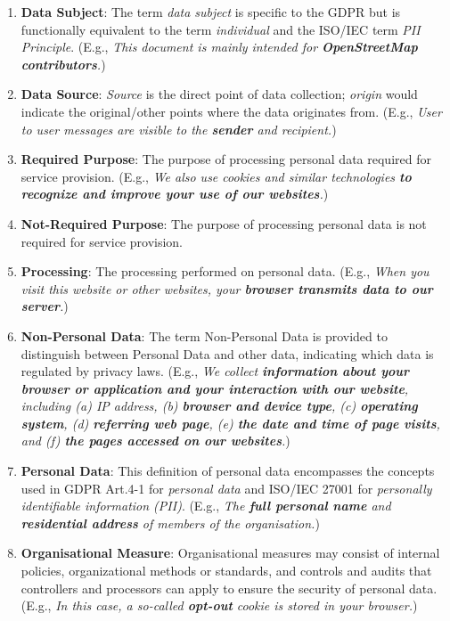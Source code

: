 \documentclass[a4paper,
               biblatex,     %
               hyphens,      %
               ]{jacow}
\begin{document}
\begin{enumerate}
    \item \textbf{Data Subject}: The term \textit{data subject} is specific to the GDPR but is functionally equivalent to the term \textit{individual} and the ISO/IEC term \textit{PII Principle}. (E.g., \textit{This document is mainly intended for \textbf{OpenStreetMap contributors}.})

    \item \textbf{Data Source}: \textit{Source} is the direct point of data collection; \textit{origin} would indicate the original/other points where the data originates from. (E.g., \textit{User to user messages are visible to the \textbf{sender} and recipient.})

    \item \textbf{Required Purpose}: The purpose of processing personal data required for service provision. (E.g., \textit{We also use cookies and similar technologies \textbf{to recognize and improve your use of our websites}.})
    
    \item \textbf{Not-Required Purpose}: The purpose of processing personal data is not required for service provision.
    
    \item \textbf{Processing}: The processing performed on personal data. (E.g., \textit{When you visit this website or other websites, your \textbf{browser transmits data to our server}.})
    
    \item \textbf{Non-Personal Data}: The term Non-Personal Data is provided to distinguish between Personal Data and other data, indicating which data is regulated by privacy laws. (E.g., \textit{We collect \textbf{information about your browser or application and your interaction with our website}, including (a) IP address, (b) \textbf{browser and device type}, (c) \textbf{operating system}, (d) \textbf{referring web page}, (e) \textbf{the date and time of page visits}, and (f) \textbf{the pages accessed on our websites}.})
    
    \item \textbf{Personal Data}: This definition of personal data encompasses the concepts used in GDPR Art.4-1 for \textit{personal data} and ISO/IEC 27001 for \textit{personally identifiable information (PII)}. (E.g., \textit{The \textbf{full personal name} and \textbf{residential address} of members of the organisation.})
    
    \item \textbf{Organisational Measure}: Organisational measures may consist of internal policies, organizational methods or standards, and controls and audits that controllers and processors can apply to ensure the security of personal data. (E.g., \textit{In this case, a so-called \textbf{opt-out} cookie is stored in your browser.})
    

\end{enumerate}
\end{document}
